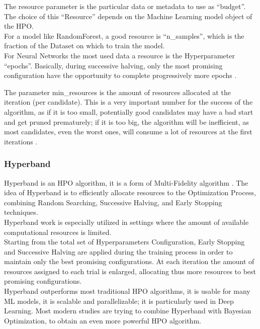 The resource parameter is the particular data or metadata to use as “budget”.
The choice of this “Resource” depends on the Machine Learning model object of the HPO.
\\[0.3cm]For a model like RandomForest, a good resource is “n\_samples”, which is the fraction of the Dataset on which to train the model.
\\[0.3cm]For Neural Networks the most used data a resource is the Hyperparameter “epochs”. Basically, during successive halving, only the most promising configuration have the opportunity to complete progressively more epochs \cite{OptunaPruners-SuccessiveHalvingAlgorithm}.

The parameter min\_resources is the amount of resources allocated at the iteration (per candidate).
This is a very important number for the success of the algorithm, as if it is too small, potentially good candidates may have a bad start and get pruned prematurely; if it is too big, the algorithm will be inefficient, as most candidates, even the worst ones, will consume a lot of resources at the first iterations \cite{OptunaPruners-SuccessiveHalvingAlgorithm}.

\subsubsection{Hyperband}

Hyperband is an HPO algorithm, it is a form of Multi-Fidelity algorithm \cite{OptunaPruners-Hyperband} \cite{Tesi-1.8}.
The idea of Hyperband is to efficiently allocate resources to the Optimization Process, combining Random Searching, Successive Halving, and Early Stopping techniques.
\\[0.3cm]Hyperband work is especially utilized in settings where the amount of available computational resources is limited.
\\[0.3cm]Starting from the total set of Hyperparameters Configuration, Early Stopping and Successive Halving are applied during the training process in order to maintain only the best promising configurations.
At each iteration the amount of resources assigned to each trial is enlarged, allocating thus more resources to best promising configurations.
\\[0.3cm]Hyperband outperforms most traditional HPO algorithms, it is usable for many ML models, it is scalable and parallelizable; it is particularly used in Deep Learning.
Most modern studies are trying to combine Hyperband with Bayesian Optimization, to obtain an even more powerful HPO algorithm.

